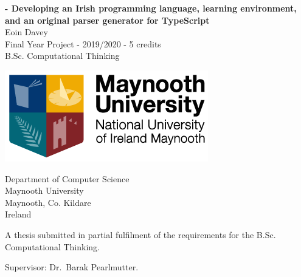 \begin{titlepage}
    \begin{center}
        \begin{LARGE}
        \textbf{\Setanta{} - Developing an Irish programming language, learning environment, and an original parser generator for TypeScript}\\
            Eoin Davey\\
        Final Year Project - 2019/2020 - 5 credits\\
        B.Sc. Computational Thinking\\

        \vspace{10mm}

        \includegraphics[scale=0.66]{maynoothlogo}

        \vspace{25mm}

        Department of Computer Science\\
        Maynooth University\\
        Maynooth, Co. Kildare\\
        Ireland
        \end{LARGE}

        \vspace{20mm}

        \begin{large}A thesis submitted in partial fulfilment of the requirements for the B.Sc. Computational Thinking.\end{large}

        \begin{LARGE}Supervisor: Dr.\ Barak Pearlmutter.\end{LARGE}
    \end{center}
\end{titlepage}
